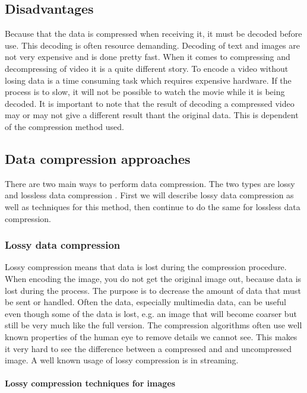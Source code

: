 \subsection{Disadvantages}
Because that the data is compressed when receiving it, it must be decoded before use. This decoding is often resource demanding. Decoding of text and images are not very expensive and is done pretty fast.  When it comes to compressing and decompressing of video it is a quite different story. To encode a video without losing data is a time consuming task which requires expensive hardware. If the process is to slow, it will not be possible to watch the movie while it is being decoded. It is important to note that the result of decoding a compressed video may or may not give a different result thant the original data. This is dependent of the compression method used.

\pagebreak

\subsection{Data compression approaches}
There are two main ways to perform data compression. The two types are lossy and lossless data compression \cite{bib:dataCompression}. First we will describe lossy data compression as well as techniques for this method, then continue to do the same for lossless data compression.

\subsubsection{Lossy data compression}
Lossy compression means that data is lost during the compression procedure. When encoding the image, you do not get the original image out, because data is lost during the process. The purpose is to decrease the amount of data that must be sent or handled. Often the data, especially multimedia data, can be useful even though some of the data is lost, e.g. an image that will become coarser but still be very much like the full version. The compression algorithms often use well known properties of the human eye to remove details we cannot see. This makes it very hard to see the difference between a compressed and and uncompressed image. A well known usage of lossy compression is in streaming.  \cite{bib:lossyCompression}

\paragraph{Lossy compression techniques for images} \hfill \newline

